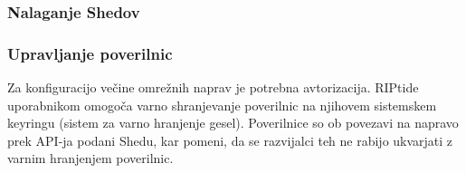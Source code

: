 \documentclass[12pt]{article}
\begin{document}
\subsubsection{Nalaganje Shedov}

\subsubsection{Upravljanje poverilnic}
Za konfiguracijo večine omrežnih naprav je potrebna avtorizacija.
RIPtide uporabnikom omogoča varno shranjevanje poverilnic na njihovem
sistemskem keyringu (sistem za varno hranjenje gesel). Poverilnice so ob
povezavi na napravo prek API-ja podani Shedu, kar pomeni, da se razvijalci
teh ne rabijo ukvarjati z varnim hranjenjem poverilnic.
\newpage
\end{document}
